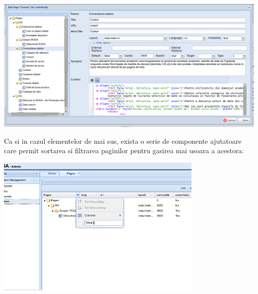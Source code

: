 \includegraphics[width=15cm]{cms/backend/pages/cmspages6}

Ca si in cazul elementelor de mai sus, exista o serie de componente
ajutatoare care permit sortarea si filtrarea paginilor pentru gasirea
mai usoara a acestora:

\includegraphics[width=10cm]{cms/backend/pages/cmspages5}
